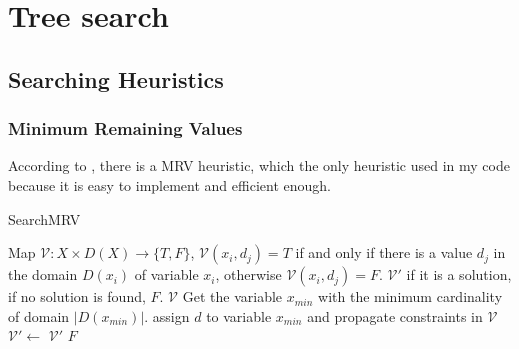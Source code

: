 \documentclass[a4paper, 12pt]{report}
\begin{document}
\chapter {Tree search}

    \section {Searching Heuristics}
        \subsection {Minimum Remaining Values}
            According to \cite{golomb1965backtrack}, there is a MRV heuristic, which the only heuristic used in my code because it is easy to implement and efficient enough.
            \begin{algorithm}
                \caption{SearchMRV}
                \label{MRV}
                \begin{algorithmic}[1]
                    \Require Map $\mathcal V:X\times D(X) \to \{T,F\}$, $\mathcal V(x_i,d_j)=T$ if and only if there is a value $d_j$ in the domain $D(x_i)$ of variable $x_i$, otherwise $\mathcal V(x_i,d_j)=F$. 
                    \Ensure $\mathcal V'$ if it is a solution, if no solution is found, $F$.
                            \State \Return $\mathcal V$
                        \EndIf
                        \State Get the variable $x_{min}$ with the minimum cardinality of domain $|D(x_{min})|$.
                            \State assign $d$ to variable $x_{min}$ and propagate constraints in $\mathcal V$
                                \State $\mathcal V'\leftarrow$ 
                                    \State \Return $\mathcal V'$
                                \EndIf
                            \EndIf
                        \EndFor
                        \State \Return $F$
                    \EndFunction
                \end{algorithmic}
            \end{algorithm}
\end{document}
